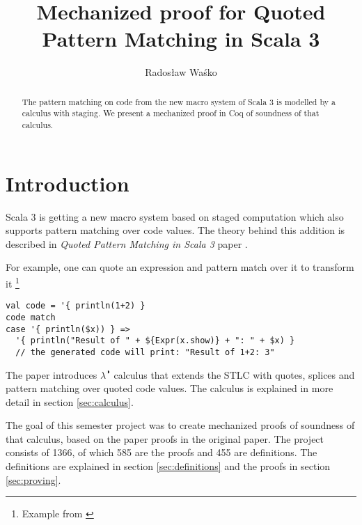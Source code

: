 \documentclass[runningheads]{article}
\begin{document}
\title{Mechanized proof for Quoted Pattern Matching in Scala 3}
%
\author{Radosław Waśko}

%
%
%
\maketitle              %
\begin{abstract}
The pattern matching on code from the new macro system of Scala 3 is modelled by a calculus with staging. We present a mechanized proof in Coq of soundness of that calculus.
%
\end{abstract}
%
%
\section{Introduction}

Scala 3 is getting a new macro system based on staged computation \cite{dottydocMacro} which also supports pattern matching over code values. The theory behind this addition is described in \textit{Quoted Pattern Matching in Scala 3} paper \cite{QPM}. 

For example, one can quote an expression and pattern match over it to transform it \footnote{Example from \cite{QPM}}
\begin{verbatim}
val code = '{ println(1+2) }
code match
case '{ println($x)) } =>
  '{ println("Result of " + ${Expr(x.show)} + ": " + $x) }
  // the generated code will print: "Result of 1+2: 3"
\end{verbatim}

The paper introduces $\lambda^{\RIGHTcircle}$ calculus that extends the STLC with quotes, splices and pattern matching over quoted code values. The calculus is explained in more detail in section \ref{sec:calculus}.

The goal of this semester project was to create mechanized proofs of soundness of that calculus, based on the paper proofs in the original paper. The project consists of 1366, of which 585 are the proofs and 455 are definitions. The definitions are explained in section \ref{sec:definitions} and the proofs in section \ref{sec:proving}.
\end{document}
